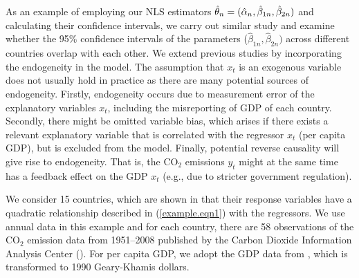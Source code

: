 As an example of employing our NLS estimators $\hat{\theta}_n = (\hat{\alpha}_n, \hat{\beta}_{1n}, \hat{\beta}_{2n})$ and calculating their confidence intervals, we carry out similar study and examine whether the 95\% confidence intervals of the parameters ($\hat{\beta}_{1n}, \hat{\beta}_{2n})$ across different countries overlap with each other. We extend previous studies by incorporating the endogeneity in the model. The assumption that $x_t$ is an exogenous variable does not usually hold in practice as there are many potential sources of endogeneity. Firstly, endogeneity occurs due to measurement error of the explanatory variables $x_t$, including the misreporting of GDP of each country. Secondly, there might be omitted variable bias, which arises if there exists a relevant explanatory variable that is correlated with the regressor $x_t$ (per capita GDP), but is excluded from the model. Finally, potential reverse causality will give rise to endogeneity. That is, the CO$_2$ emissions $y_t$ might at the same time has a feedback effect on the GDP $x_t$ (e.g., due to stricter government regulation).


We consider 15 countries, which are shown in \cite{piaggiopadilla2010} that their response variables have a quadratic relationship described in (\ref{example.eqn1}) with the regressors. We use annual data in this example and for each country, there are 58 observations of the CO$_2$ emission data from 1951--2008 published by the Carbon Dioxide Information Analysis Center (\cite{bodenmarlandandres2009}). For per capita GDP, we adopt the GDP data from \cite{maddison2003}, which is transformed to 1990 Geary-Khamis dollars.

